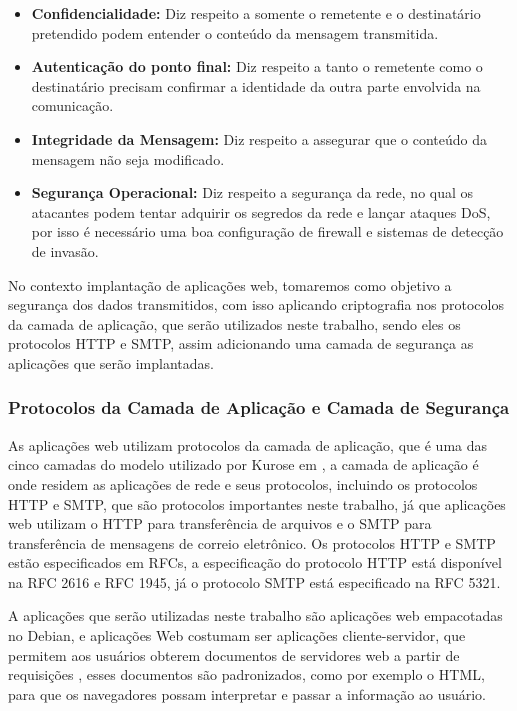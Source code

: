 \begin{itemize}
  \item \textbf{Confidencialidade:} Diz respeito a somente o remetente e o destinatário
  pretendido podem entender o conteúdo da mensagem transmitida.
  \item \textbf{Autenticação do ponto final:} Diz respeito a tanto o remetente como o destinatário
  precisam confirmar a identidade da outra parte envolvida na comunicação.
  \item \textbf{Integridade da Mensagem:} Diz respeito a assegurar que o conteúdo
  da mensagem não seja modificado.
  \item \textbf{Segurança Operacional:} Diz respeito a segurança da rede, no qual
  os atacantes podem tentar adquirir os segredos da rede e lançar ataques DoS,
  por isso é necessário uma boa configuração de firewall e sistemas de detecção
  de invasão.
\end{itemize}

No contexto implantação de aplicações web, tomaremos como objetivo a segurança
dos dados transmitidos, com isso aplicando criptografia nos protocolos da camada
de aplicação, que serão utilizados neste trabalho, sendo eles os protocolos HTTP
e SMTP, assim adicionando uma camada de segurança as aplicações que
serão implantadas.

\subsubsection{Protocolos da Camada de Aplicação e Camada de Segurança}

As aplicações web utilizam protocolos da camada de aplicação, que é uma das
cinco camadas do modelo utilizado por Kurose em \cite{kurose2010redes}, a camada
de aplicação é onde residem as aplicações de rede e seus protocolos, incluindo
os protocolos HTTP e SMTP, que são protocolos importantes neste trabalho, já que
aplicações web utilizam o HTTP para transferência de arquivos e o SMTP para
transferência de mensagens de correio eletrônico. Os protocolos HTTP e SMTP estão especificados em RFCs, a especificação do protocolo
HTTP está disponível na RFC 2616 e RFC 1945, já o protocolo SMTP está especificado na RFC 5321.

A aplicações que serão utilizadas neste trabalho são aplicações web empacotadas no
Debian, e aplicações Web costumam ser aplicações cliente-servidor, que permitem aos
usuários obterem documentos de servidores web a partir de requisições \cite{kurose2010redes},
esses documentos são padronizados, como por exemplo o HTML, para que os navegadores
possam interpretar e passar a informação ao usuário.

